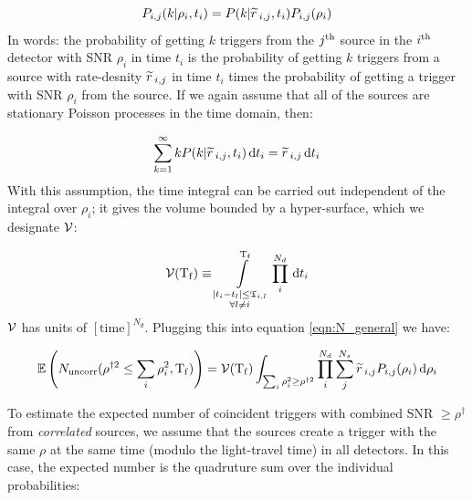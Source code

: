 \begin{equation}
\label{eqn:twoDpdf}
P_{i,j}(k|\rho_i,t_i) = P(k|\widetilde{r}\,_{i,j},t_i)P_{i,j}(\rho_i)
\end{equation}
In words: the probability of getting $k$ triggers from the $j^{\mathrm{th}}$ source in the $i^{\mathrm{th}}$ detector with \ac{SNR} $\rho_i$ in time $t_i$ is the probability of getting $k$ triggers from a source with rate-desnity $\widetilde{r}\,_{i,j}$ in time $t_i$ times the probability of getting a trigger with \ac{SNR} $\rho_i$ from the source. If we again assume that all of the sources are stationary Poisson processes in the time domain, then:

\begin{equation}
\sum_{k=1}^{\infty} k P(k|\widetilde{r}\,_{i,j},t_i) \,\mathrm{d} t_i = \widetilde{r}\,_{i,j} \,\mathrm{d} t_i
\end{equation}
With this assumption, the time integral can be carried out independent of the integral over $\rho_i$; it gives the volume bounded by a hyper-surface, which we designate $\mathcal{V}$:

\begin{equation}
\label{eqn:vTdef}
\mathcal{V}(\mathrm{T_f}) \equiv \int\limits_{\substack{ |t_i - t_l| \leq \mathfrak{T}_{i,l} \\ \forall l \neq i}}^{\mathrm{T_f}} \prod_i^{N_d} \,\mathrm{d} t_i
\end{equation}
$\mathcal{V}$ has units of $[\mathrm{time}]^{N_d}$. Plugging this into equation \ref{eqn:N_general} we have:

\begin{equation}
\label{eqn:N_rate_general}
\mathbb{E}\left(N_{\mathrm{uncorr}}(\rho^{\dagger2} \leq \sum_i\rho_i^2, \mathrm{T_f} )\right) = \mathcal{V}(\mathrm{T_f}) \int_{\sum_i\rho_i^2 \geq \rho^{\dagger2}} \prod_i^{N_d} \sum_j^{N_s} \widetilde{r}\,_{i,j} P_{i,j}(\rho_i) \,\mathrm{d}\rho_i
\end{equation}

To estimate the expected number of coincident triggers with combined \ac{SNR} $\geq \rho^\dagger$ from \emph{correlated} sources, we assume that the sources create a trigger with the same $\rho$ at the same time (modulo the light-travel time) in all detectors. In this case, the expected number is the quadruture sum over the individual probabilities:

